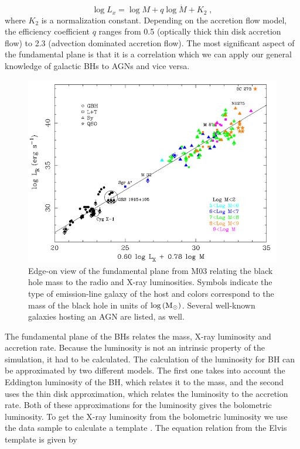 \begin{equation}
\log L_{x}=\log M+q\log\dot{M}+K_{2}\;,\label{eq:LxFP}
\end{equation}
where $K_{2}$ is a normalization constant. Depending on the accretion
flow model, the efficiency coefficient $q$ ranges from 0.5 (optically
thick thin disk accretion flow) to 2.3 (advection dominated accretion
flow). The most significant aspect of the fundamental plane is that
it is a correlation which we can apply our general knowledge of galactic
BHs to AGNs and vice versa.
\begin{figure}
\centering{}\includegraphics[clip,scale=0.35]{Figures/FP} \protect\caption{\label{fig:Fp}Edge-on view of the fundamental plane from M03 relating
the black hole mass to the radio and X-ray luminosities. Symbols indicate
the type of emission-line galaxy of the host and colors correspond
to the mass of the black hole in units of $\log\left({\rm M}_{\odot}\right)$.
Several well-known galaxies hosting an AGN are listed, as well.}
\end{figure}


The fundamental plane of the BHs relates the mass, X-ray luminosity
and accretion rate. Because the luminosity is not an intrinsic property
of the simulation, it had to be calculated. The calculation of the
luminosity for BH can be approximated by two different models. The
first one takes into account the Eddington luminosity of the BH, which
relates it to the mass, and the second uses the thin disk approximation,
which relates the luminosity to the accretion rate. Both of these
approximations for the luminosity gives the bolometric luminosity.
To get the X-ray luminosity from the bolometric luminosity we use
the \citet{elvis1994atlasof} data sample to calculate a template
. The equation relation from the Elvis template is given by

